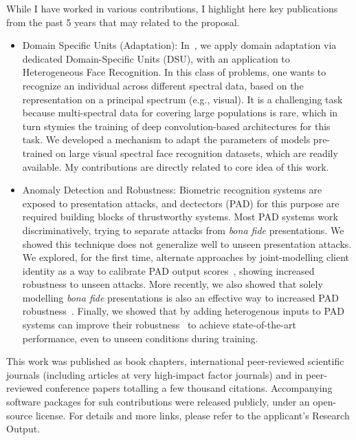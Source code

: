 \documentclass[11pt,a4paper,sans]{moderncv}
\begin{document}
While I have worked in various contributions, I highlight here key publications
from the past 5 years that may related to the proposal.

\begin{itemize}

    \item Domain Specific Units (Adaptation): In~\cite{tifs-2019}, we apply
        domain adaptation via dedicated Domain-Specific Units (DSU), with an
        application to Heterogeneous Face Recognition.  In this class of
        problems, one wants to recognize an individual across different
        spectral data,  based on the representation on a principal spectrum
        (e.g., visual).  It is a challenging task because multi-spectral data
        for covering large populations is rare, which in turn stymies the
        training of deep convolution-based architectures for this task.  We
        developed a mechanism to adapt the parameters of models pre-trained on
        large visual spectral face recognition datasets, which are readily
        available.  My contributions are directly related to core idea of this
        work.

  \item Anomaly Detection and Robustness: Biometric recognition systems are
      exposed to presentation attacks, and dectectors (PAD) for this purpose
      are required building blocks of thrustworthy systems.  Most PAD systems
      work discriminatively, trying to separate attacks from \textit{bona fide}
      presentations.  We showed this technique does not generalize well to
      unseen presentation attacks.  We explored, for the first time, alternate
      approaches by joint-modelling client identity as a way to calibrate PAD
      output scores~\cite{tifs-2015}, showing increased robustness to unseen
      attacks.  More recently, we also showed that solely modelling
      \textit{bona fide} presentations is also an effective way to increased
      PAD robustness~\cite{icb-2018}.  Finally, we showed that by adding
      heterogenous inputs to PAD systems can improve their
      robustness~\cite{tifs-2019-2} to achieve state-of-the-art performance,
      even to unseen conditions during training.

\end{itemize}

This work was published as book chapters, international peer-reviewed
scientific journals (including articles at very high-impact factor journals)
and in peer-reviewed conference papers totalling a few thousand citations.
Accompanying software packages for suh contributions were released publicly,
under an open-source license. For details and more links, please refer to the
applicant's Research Output.
\end{document}
